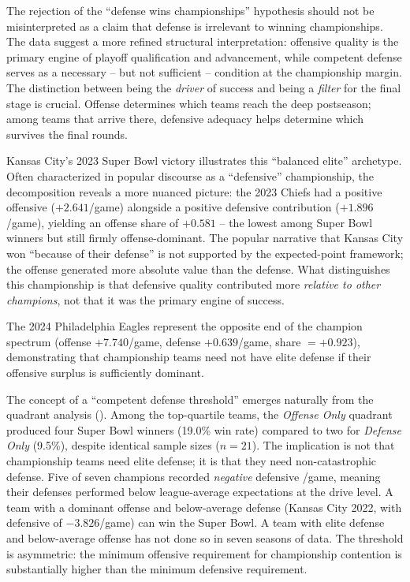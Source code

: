 The rejection of the ``defense wins championships'' hypothesis should not be
misinterpreted as a claim that defense is irrelevant to winning championships.
The data suggest a more refined structural interpretation: offensive quality is
the primary engine of playoff qualification and advancement, while competent
defense serves as a necessary -- but not sufficient -- condition at the championship
margin. The distinction between being the \emph{driver} of success and being a
\emph{filter} for the final stage is crucial. Offense determines which teams
reach the deep postseason; among teams that arrive there, defensive adequacy
helps determine which survives the final rounds.

Kansas City's 2023 Super Bowl victory illustrates this ``balanced elite''
archetype. Often characterized in popular discourse as a ``defensive''
championship, the \gds{} decomposition reveals a more nuanced picture:
the 2023 Chiefs had a positive offensive \xvoa{} ($+2.641$/game) alongside a
positive defensive contribution ($+1.896$/game), yielding an offense share of
$+0.581$ -- the lowest among Super Bowl winners but still firmly
offense-dominant. The popular narrative that Kansas City won ``because of their
defense'' is not supported by the expected-point framework; the offense
generated more absolute value than the defense. What distinguishes this
championship is that defensive quality contributed more \emph{relative to other
champions}, not that it was the primary engine of success.

The 2024 Philadelphia Eagles represent the opposite end of the champion
spectrum (offense $+7.740$/game, defense $+0.639$/game, share $= +0.923$),
demonstrating that championship teams need not have elite defense if their
offensive surplus is sufficiently dominant.

The concept of a ``competent defense threshold'' emerges naturally from the
quadrant analysis (). Among the top-quartile \gds{}
teams, the \textit{Offense Only} quadrant produced four Super Bowl winners
(19.0\% win rate) compared to two for \textit{Defense Only} (9.5\%), despite
identical sample sizes ($n = 21$). The implication is not that championship
teams need elite defense; it is that they need non-catastrophic defense. Five of seven champions recorded \emph{negative} defensive
\xvoa{}/game, meaning their defenses performed below league-average
expectations at the drive level. A team with a dominant offense and below-average
defense (Kansas City 2022, with defensive \xvoa{} of $-3.826$/game) can win the
Super Bowl. A team with elite defense and below-average offense has not done so
in seven seasons of data. The threshold is asymmetric: the minimum offensive
requirement for championship contention is substantially higher than the minimum
defensive requirement.


